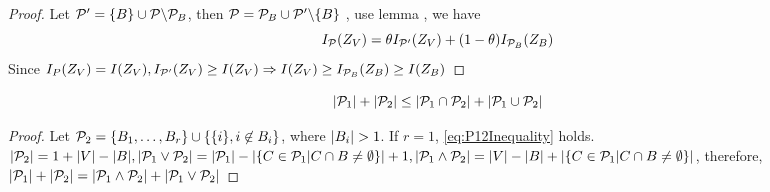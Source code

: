 \begin{proof}
Let $\P' = \{B\} \cup \P\backslash \P_B$, then $\P = \P_B \cup \P'\backslash\{B\}$ , use lemma , we have
\begin{equation}
I_{\P}(Z_V) = \theta I_{\P'}(Z_V) + (1-\theta) I_{\P_B}(Z_B)
\end{equation}
Since  $I_{P}(Z_V) = I(Z_V), I_{\P'}(Z_V)\geq I(Z_V) \Rightarrow I(Z_V) \geq I_{\P_B}(Z_B) \geq I(Z_B)$ 
\end{proof}
\begin{lemma}
\begin{equation}\label{eq:P12Inequality}
\abs{\P_1} + \abs{\P_2} \leq \abs{\P_1 \cap \P_2} + \abs{\P_1 \cup \P_2}
\end{equation}
\end{lemma}
\begin{proof}
Let $\P_2 = \{B_1, \dots, B_r\} \cup \{\{i\}, i\not\in B_i\}$, where $\abs{B_i}>1$.
If $r=1$, \eqref{eq:P12Inequality} holds.
$\abs{\P_2} = 1+ \abs{V} - \abs{B}, \abs{\P_1 \vee \P_2} = \abs{\P_1} - \abs{\{C\in \P_1 | C\cap B \neq \emptyset \}}+1, \abs{\P_1 \wedge \P_2} = \abs{V} - \abs{B} + \abs{\{C\in \P_1 | C\cap B \neq \emptyset \}}$,
 therefore, $\abs{\P_1} + \abs{\P_2} = \abs{\P_1 \wedge \P_2} + \abs{\P_1 \vee \P_2}$
\end{proof}